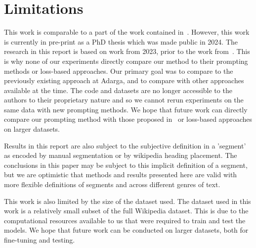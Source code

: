 \section*{Limitations}

This work is comparable to a part of the work contained in~\cite{XingThesis}. However, this work is currently in pre-print as a PhD thesis which was made public in 2024. The research in this report is based on work from 2023, prior to the work from~\cite{XingThesis}. This is why none of our experiments directly compare our method to their prompting methods or loss-based approaches. Our primary goal was to compare to the previously existing approach at Adarga, and to compare with other approaches available at the time. The code and datasets are no longer accessible to the authors to their proprietary nature and so we cannot rerun experiments on the same data with new prompting methods. We hope that future work can directly compare our prompting method with those proposed in~\cite{XingThesis} or loss-based approaches on larger datasets.

Results in this report are also subject to the subjective definition in a 'segment' as encoded by manual segmentation or by wikipedia heading placement. The conclusions in this paper may be subject to this implicit definition of a segment, but we are optimistic that methods and results presented here are valid with more flexible definitions of segments and across different genres of text.

This work is also limited by the size of the dataset used. The dataset used in this work is a relatively small subset of the full Wikipedia dataset. This is due to the computational resources available to us that were required to train and test the models. We hope that future work can be conducted on larger datasets, both for fine-tuning and testing.